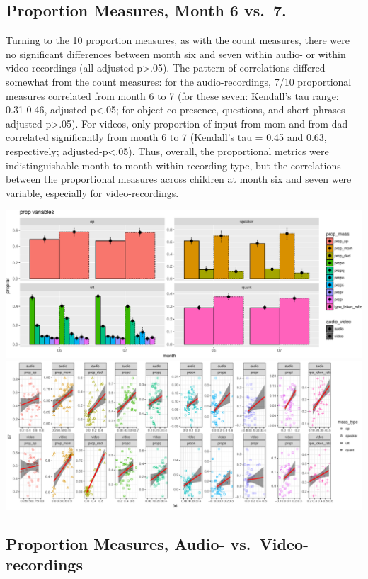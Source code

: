 \documentclass[floatsintext,man]{apa6}
\theoremstyle{definition}
\theoremstyle{definition}
\theoremstyle{definition}
\theoremstyle{remark}
\begin{document}
\subsection{Proportion Measures, Month 6
vs.~7.}\label{proportion-measures-month-6-vs.7.}

Turning to the 10 proportion measures, as with the count measures, there
were no significant differences between month six and seven within
audio- or within video-recordings (all adjusted-p\textgreater{}.05). The
pattern of correlations differed somewhat from the count measures: for
the audio-recordings, 7/10 proportional measures correlated from month 6
to 7 (for these seven: Kendall's tau range: 0.31-0.46,
adjusted-p\textless{}.05; for object co-presence, questions, and
short-phrases adjusted-p\textgreater{}.05). For videos, only proportion
of input from mom and from dad correlated significantly from month 6 to
7 (Kendall's tau = 0.45 and 0.63, respectively;
adjusted-p\textless{}.05). Thus, overall, the proportional metrics were
indistinguishable month-to-month within recording-type, but the
correlations between the proportional measures across children at month
six and seven were variable, especially for video-recordings.

\includegraphics{sixseven_papaja_files/figure-latex/gr_derived_props-1.pdf}
\includegraphics{sixseven_papaja_files/figure-latex/gr_derived_props-2.pdf}

\subsection{Proportion Measures, Audio-
vs.~Video-recordings}\label{proportion-measures-audio--vs.video-recordings}
\end{document}
